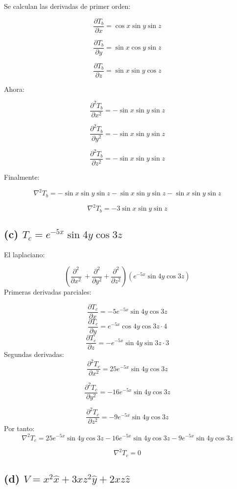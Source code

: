\documentclass[12pt]{article}
\begin{document}
Se calculan las derivadas de primer orden:

\[
\frac{\partial T_b}{\partial x} = \cos x \sin y \sin z
\]

\[
\frac{\partial T_b}{\partial y} = \sin x \cos y \sin z
\]

\[
\frac{\partial T_b}{\partial z} = \sin x \sin y \cos z
\]

Ahora:

\[
\frac{\partial^2 T_b}{\partial x^2} = -\sin x \sin y \sin z
\]

\[
\frac{\partial^2 T_b}{\partial y^2} = -\sin x \sin y \sin z
\]

\[
\frac{\partial^2 T_b}{\partial z^2} = -\sin x \sin y \sin z
\]

Finalmente:

\[
\nabla^2 T_b = -\sin x \sin y \sin z - \sin x \sin y \sin z - \sin x \sin y \sin z
\]

\[
\boxed{\nabla^2 T_b = -3 \sin x \sin y \sin z}
\]

\subsection*{(c) \( T_c = e^{-5x} \sin 4y \cos 3z \)}

El laplaciano:

\[
 \left( \frac{\partial^2}{\partial x^2}\  + \frac{\partial^2}{\partial y^2}+ \frac{\partial^2}{\partial z^2} \right) \left( e^{-5x} \sin 4y \cos 3z \right)
\]
Primeras derivadas parciales:

\[
\frac{\partial T_c}{\partial x} = -5e^{-5x} \sin 4y \cos 3z
\]
\[
\frac{\partial T_c}{\partial y} = e^{-5x} \cos 4y \cos 3z \cdot 4
\]
\[
\frac{\partial T_c}{\partial z} = -e^{-5x} \sin 4y \sin 3z \cdot 3
\]
Segundas derivadas:
\[
\frac{\partial^2 T_c}{\partial x^2} = 25e^{-5x} \sin 4y \cos 3z
\]

\[
\frac{\partial^2 T_c}{\partial y^2} = -16e^{-5x} \sin 4y \cos 3z
\]


\[
\frac{\partial^2 T_c}{\partial z^2} = -9e^{-5x} \sin 4y \cos 3z
\]
Por tanto:
\[
\nabla^2 T_c = 25e^{-5x} \sin 4y \cos 3z - 16e^{-5x} \sin 4y \cos 3z - 9e^{-5x} \sin 4y \cos 3z
\]

\[
\boxed{\nabla^2 T_c = 0}
\]

\subsection*{(d) \( V = x^2 \hat{x} + 3x z^2 \hat{y} + 2xz \hat{z} \)}
\end{document}
